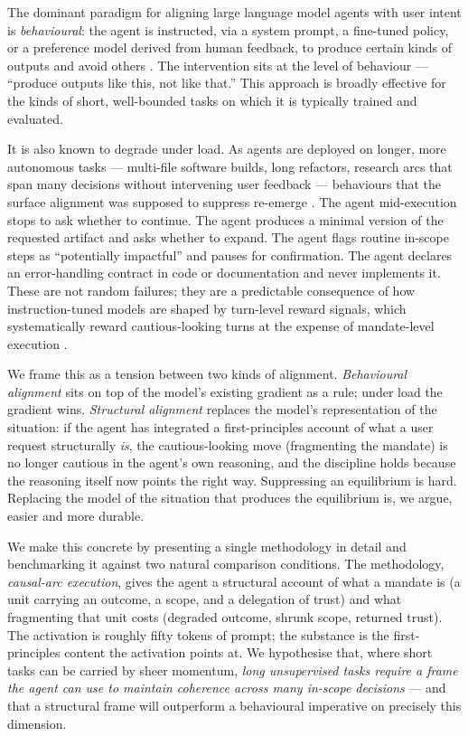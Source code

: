 \documentclass[11pt]{article}
\begin{document}
The dominant paradigm for aligning large language model agents with user
intent is \emph{behavioural}: the agent is instructed, via a system prompt,
a fine-tuned policy, or a preference model derived from human feedback, to
produce certain kinds of outputs and avoid others
\citep{ouyang2022training,bai2022training,christiano2017deep}. The
intervention sits at the level of behaviour --- ``produce outputs like
this, not like that.'' This approach is broadly effective for the kinds of
short, well-bounded tasks on which it is typically trained and evaluated.

It is also known to degrade under load. As agents are deployed on longer,
more autonomous tasks --- multi-file software builds, long refactors,
research arcs that span many decisions without intervening user feedback
--- behaviours that the surface alignment was supposed to suppress
re-emerge \citep{perez2022discovering,sharma2024towards,kenton2021alignment}.
The agent mid-execution stops to ask whether to continue. The agent
produces a minimal version of the requested artifact and asks whether to
expand. The agent flags routine in-scope steps as ``potentially impactful''
and pauses for confirmation. The agent declares an error-handling
contract in code or documentation and never implements it. These are not
random failures; they are a predictable consequence of how
instruction-tuned models are shaped by turn-level reward signals, which
systematically reward cautious-looking turns at the expense of
mandate-level execution \citep{ji2023ai,leike2018scalable}.

We frame this as a tension between two kinds of alignment. \emph{Behavioural
alignment} sits on top of the model's existing gradient as a rule; under
load the gradient wins. \emph{Structural alignment} replaces the model's
representation of the situation: if the agent has integrated a first-principles
account of what a user request structurally \emph{is}, the cautious-looking
move (fragmenting the mandate) is no longer cautious in the agent's own
reasoning, and the discipline holds because the reasoning itself now points
the right way. Suppressing an equilibrium is hard. Replacing the model of
the situation that produces the equilibrium is, we argue, easier and more
durable.

We make this concrete by presenting a single methodology in detail and
benchmarking it against two natural comparison conditions. The methodology,
\emph{causal-arc execution}, gives the agent a structural account of what a
mandate is (a unit carrying an outcome, a scope, and a delegation of trust)
and what fragmenting that unit costs (degraded outcome, shrunk scope,
returned trust). The activation is roughly fifty tokens of prompt; the
substance is the first-principles content the activation points at. We
hypothesise that, where short tasks can be carried by sheer momentum,
\emph{long unsupervised tasks require a frame the agent can use to maintain
coherence across many in-scope decisions} --- and that a structural frame
will outperform a behavioural imperative on precisely this dimension.
\end{document}
